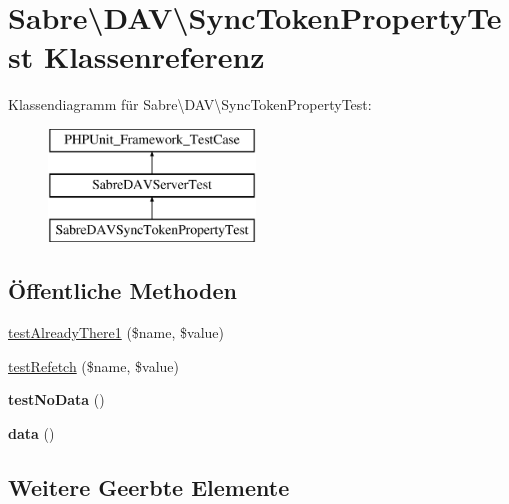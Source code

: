 \hypertarget{class_sabre_1_1_d_a_v_1_1_sync_token_property_test}{}\section{Sabre\textbackslash{}D\+AV\textbackslash{}Sync\+Token\+Property\+Test Klassenreferenz}
\label{class_sabre_1_1_d_a_v_1_1_sync_token_property_test}
Klassendiagramm für Sabre\textbackslash{}D\+AV\textbackslash{}Sync\+Token\+Property\+Test\+:\begin{figure}[H]
\begin{center}
\leavevmode
\includegraphics[height=3.000000cm]{class_sabre_1_1_d_a_v_1_1_sync_token_property_test}
\end{center}
\end{figure}
\subsection*{Öffentliche Methoden}
\begin{DoxyCompactItemize}
\item 
\mbox{\hyperlink{class_sabre_1_1_d_a_v_1_1_sync_token_property_test_aa453418e5601d340da220568ffb74c65}{test\+Already\+There1}} (\$name, \$value)
\item 
\mbox{\hyperlink{class_sabre_1_1_d_a_v_1_1_sync_token_property_test_a4d3758eea19264a705486e44ca95b5c5}{test\+Refetch}} (\$name, \$value)
\item 
\mbox{\label{class_sabre_1_1_d_a_v_1_1_sync_token_property_test_a5f1431884b5c56d95349417fa3d9b6be}} 
{\bfseries test\+No\+Data} ()
\item 
\mbox{\label{class_sabre_1_1_d_a_v_1_1_sync_token_property_test_a094aea92bceee730723877e4baa2b8d2}} 
{\bfseries data} ()
\end{DoxyCompactItemize}
\subsection*{Weitere Geerbte Elemente}


